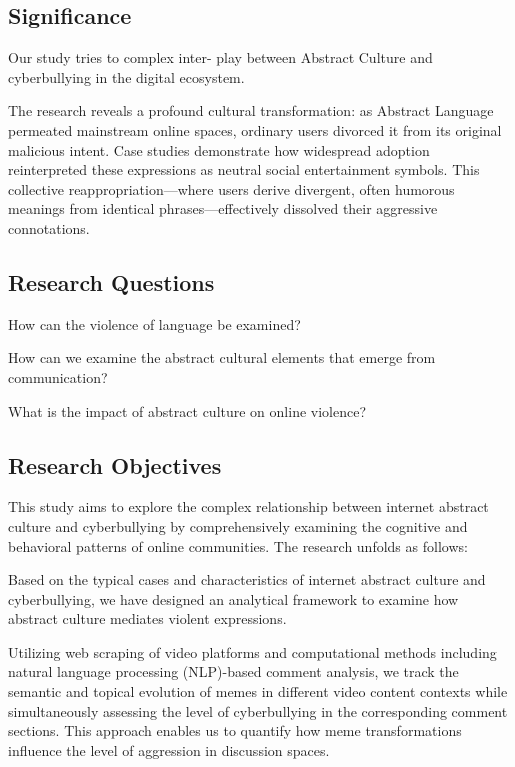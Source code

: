\documentclass[12pt,a4paper]{ctexart}
\theoremstyle{MyLineTheoremStyle}
\theoremstyle{MyBlockTheoremStyle}
\theoremstyle{MySubsubsectionStyle}
\begin{document}
\subsection{Significance}

Our study  tries to  complex  inter- play between Abstract Culture and cyberbullying in the digital ecosystem.

The research reveals a profound cultural transformation: as Abstract Language permeated mainstream online spaces, ordinary users divorced it from its original malicious intent. Case studies demonstrate how widespread adoption reinterpreted these expressions as neutral social entertainment symbols. This collective reappropriation—where users derive divergent, often humorous meanings from identical phrases—effectively dissolved their aggressive connotations. 

\subsection{Research Questions}  
How can the violence of language be examined? %

How can we examine the abstract cultural elements that emerge from communication?%

What is the impact of abstract culture on online violence?%

\subsection{Research Objectives}%

This study aims to explore the complex relationship between internet abstract culture and cyberbullying by comprehensively examining the cognitive and behavioral patterns of online communities. The research unfolds as follows:

Based on the typical cases and characteristics of internet abstract culture and cyberbullying, we have designed an analytical framework to examine how abstract culture mediates violent expressions.

Utilizing web scraping of video platforms and computational methods including natural language processing (NLP)-based comment analysis, we track the semantic and topical evolution of memes in different video content contexts while simultaneously assessing the level of cyberbullying in the corresponding comment sections. This approach enables us to quantify how meme transformations influence the level of aggression in discussion spaces.
\end{document}
